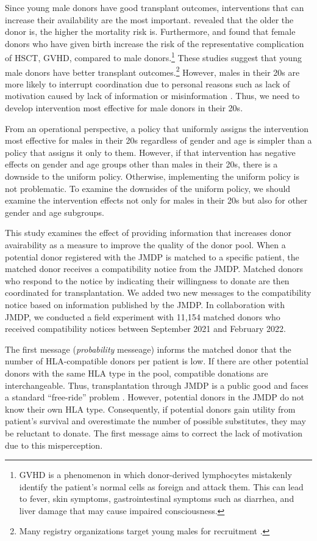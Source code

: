 \documentclass[12pt, a4paper]{article}
\begin{document}
Since young male donors have good transplant outcomes, interventions that can increase their availability are the most important. \citet{Kollman2016} revealed that the older the donor is, the higher the mortality risk is. Furthermore, \citet{Loren2006} and \citet{Kollman2016} found that female donors who have given birth increase the risk of the representative complication of HSCT, GVHD, compared to male donors.\footnote{GVHD is a phenomenon in which donor-derived lymphocytes mistakenly identify the patient's normal cells as foreign and attack them. This can lead to fever, skin symptoms, gastrointestinal symptoms such as diarrhea, and liver damage that may cause impaired consciousness.} These studies suggest that young male donors have better transplant outcomes.\footnote{Many registry organizations target young males for recruitment \citep{Fingrut2018}.} However, males in their 20s are more likely to interrupt coordination due to personal reasons such as lack of motivation caused by lack of information or misinformation \citep{Hirakawa2018, Kurosawa2022}. Thus, we need to develop intervention most effective for male donors in their 20s.

From an operational perspective, a policy that uniformly assigns the intervention most effective for males in their 20s regardless of gender and age is simpler than a policy that assigns it only to them. However, if that intervention has negative effects on gender and age groups other than males in their 20s, there is a downside to the uniform policy. Otherwise, implementing the uniform policy is not problematic. To examine the downsides of the uniform policy, we should examine the intervention effects not only for males in their 20s but also for other gender and age subgroups.

This study examines the effect of providing information that increases donor avairability as a measure to improve the quality of the donor pool. When a potential donor registered with the JMDP is matched to a specific patient, the matched donor receives a compatibility notice from the JMDP. Matched donors who respond to the notice by indicating their willingness to donate are then coordinated for transplantation. We added two new messages to the compatibility notice based on information published by the JMDP. In collaboration with JMDP, we conducted a field experiment with 11,154 matched donors who received compatibility notices between September 2021 and February 2022.

The first message (\emph{probability} messeage) informs the matched donor that the number of HLA-compatible donors per patient is low. If there are other potential donors with the same HLA type in the pool, compatible donations are interchangeable. Thus, transplantation through JMDP is a public good and faces a standard ``free-ride'' problem \citep{Bergstrom2009}. However, potential donors in the JMDP do not know their own HLA type. Consequently, if potential donors gain utility from patient's survival and overestimate the number of possible substitutes, they may be reluctant to donate. The first message aims to correct the lack of motivation due to this misperception.
\end{document}
